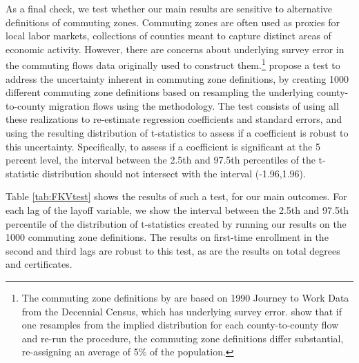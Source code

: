 As a final check, we test whether our main results are sensitive to alternative definitions of commuting zones. Commuting zones are often used as proxies for local labor markets, collections of counties meant to capture distinct areas of economic activity. However, there are concerns  about underlying survey error in the commuting flows data \citet{TS1996} originally used to construct them.\footnote{ The commuting zone definitions by \citet{TS1996} are based on 1990 Journey to Work Data from the Decennial Census, which has underlying survey error. \citet{FKV2017} show that if one resamples from the implied distribution for each county-to-county flow and re-run the procedure, the commuting zone definitions differ substantial, re-assigning an average of 5\% of the population.} \citet{FKV2017} propose a test to address the uncertainty inherent in commuting zone definitions, by creating 1000 different commuting zone definitions based on resampling the underlying county-to-county migration flows using the \citet{TS1996} methodology. The test consists of using  all these realizations to re-estimate regression coefficients and standard errors, and using the resulting distribution of t-statistics to assess if a coefficient is robust to this uncertainty. Specifically, to assess if a coefficient is significant at the 5 percent level, the interval between the 2.5th and 97.5th percentiles of the t-statistic distribution should  not intersect with the interval (-1.96,1.96). 

Table \ref{tab:FKVtest} shows the results of such a test, for our main outcomes. For each lag of the layoff variable, we show the interval between the 2.5th and 97.5th percentile of the distribution of t-statistics created by running our results on the 1000 commuting zone definitions. The results on first-time enrollment in the second and third lags are robust to this test, as are the results on total degrees and certificates. 
